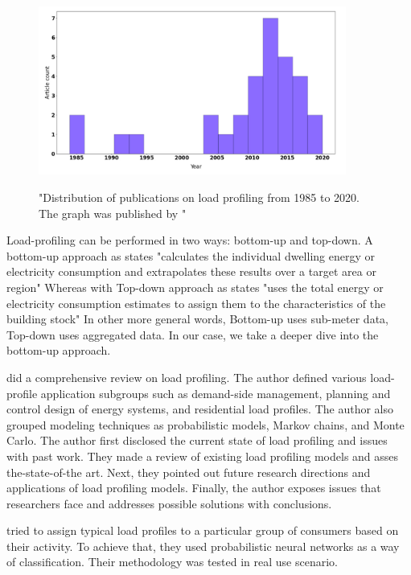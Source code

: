 \begin{figure}[H]
	\centering
	\caption{"Distribution of publications on load profiling from 1985 to 2020. The graph was published by \protect\cite{Review2021}"}
	\includegraphics[width=0.9\textwidth]{Figures/publications.png}
	\label{fig:Distribution}
\end{figure}

Load-profiling can be performed in two ways: bottom-up and top-down. 
A bottom-up approach as \cite{SWAN20091819} states "calculates the individual dwelling energy or electricity consumption and extrapolates these results over a target area or region"
Whereas with Top-down approach as \cite{SWAN20091819} states "uses the total energy or electricity consumption estimates to assign them to the characteristics of the building stock"
In other more general words, Bottom-up uses sub-meter data, Top-down uses aggregated data. 
In our case, we take a deeper dive into the bottom-up approach.

\cite{Review2021} did a comprehensive review on load profiling. The author defined various load-profile application
subgroups such as demand-side management, planning and control design of energy systems, and residential load profiles. The author also 
grouped modeling techniques as probabilistic models, Markov chains, and Monte Carlo. The author first disclosed the current state of load profiling and issues with past work.
They made a review of existing load profiling models
and asses the-state-of-the art. 
Next, they pointed out future research directions
and applications of load profiling models. Finally, the author exposes issues that researchers face and addresses possible solutions with conclusions.

\cite{GERBEC2005} tried to assign typical load profiles to a particular group of consumers based on their activity. 
To achieve that, they used probabilistic neural networks as a way of classification. Their methodology was tested in real use scenario. 


